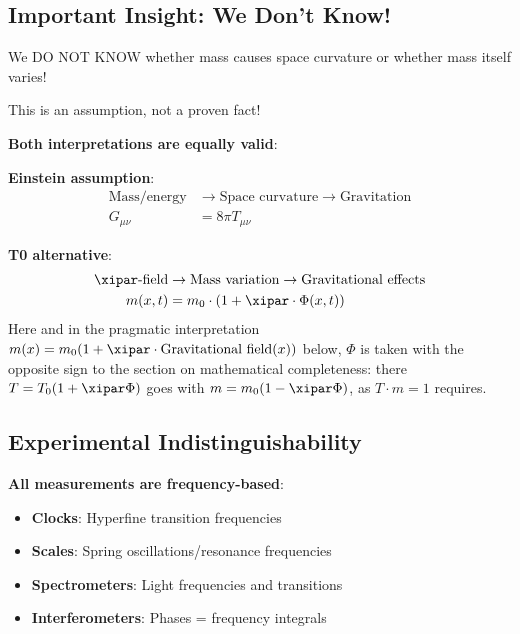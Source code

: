 	\subsection{Important Insight: We Don't Know!}
	
	\begin{tcolorbox}[colback=red!5!white,colframe=red!75!black,title=Attention - Fundamental Point]
		We DO NOT KNOW whether mass causes space curvature or whether mass itself varies!
		
		This is an assumption, not a proven fact!
	\end{tcolorbox}
	
	\textbf{Both interpretations are equally valid}:
	
	\textbf{Einstein assumption}:
	\begin{align}
		\text{Mass/energy} &\rightarrow \text{Space curvature} \rightarrow \text{Gravitation} \\
		G_{\mu\nu} &= 8\pi T_{\mu\nu}
	\end{align}
	
	\textbf{T0 alternative}:
	\begin{align}
		\xipar\text{-field} &\rightarrow \text{Mass variation} \rightarrow \text{Gravitational effects} \\
		m(x,t) &= m_0 \cdot (1 + \xipar \cdot \Phi(x,t))
	\end{align}
	Here and in the pragmatic interpretation $m(x) = m_0(1 + \xipar \cdot \text{Gravitational field}(x))$ below, $\Phi$ is taken with the opposite sign to the section on mathematical completeness: there $T = T_0(1 + \xipar\Phi)$ goes with $m = m_0(1 - \xipar\Phi)$, as $T \cdot m = 1$ requires.
	
	\subsection{Experimental Indistinguishability}
	
	\textbf{All measurements are frequency-based}:
	\begin{itemize}
		\item \textbf{Clocks}: Hyperfine transition frequencies
		\item \textbf{Scales}: Spring oscillations/resonance frequencies
		\item \textbf{Spectrometers}: Light frequencies and transitions
		\item \textbf{Interferometers}: Phases = frequency integrals
	\end{itemize}
	
